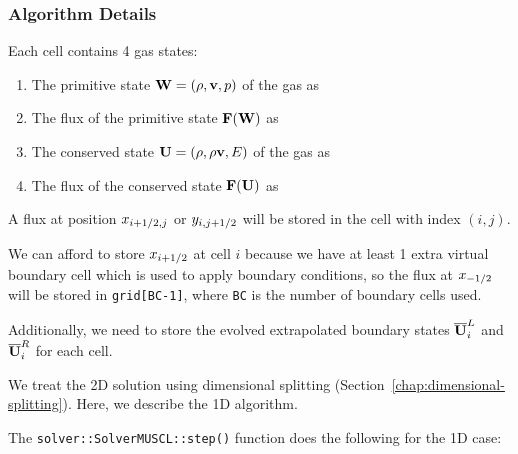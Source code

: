 \subsubsection{Algorithm Details}

Each cell contains 4 gas states:

\begin{enumerate}
\item The primitive state $\mathbf{W} = (\rho, \mathbf{v}, p)$ of the gas as 
\item The flux of the primitive state $\mathbf{F}(\mathbf{W})$ as 
\item The conserved state $\mathbf{U} = (\rho, \rho \mathbf{v}, E)$ of the gas as 
\item The flux of the conserved state $\mathbf{F}(\mathbf{U})$ as 
\end{enumerate}


A flux at position $x_{i+1/2, j}$ or $y_{i, j+1/2}$ will be stored in the
cell with index $(i, j)$.


We can afford to store $x_{i+1/2}$ at cell $i$ because we have at least 1
extra virtual boundary cell which is used to apply boundary conditions, so the
flux at $x_{-1/2}$ will be stored in \verb|grid[BC-1]|, where \texttt{BC} is
the number of boundary cells used.


Additionally, we need to store the evolved extrapolated boundary states
$\overline{\mathbf{U}}_i^L$ and $\overline{\mathbf{U}}_i^R$ for each cell.


We treat the 2D solution using dimensional splitting
(Section~\ref{chap:dimensional-splitting}). Here, we describe the 1D algorithm.

The \verb|solver::SolverMUSCL::step()| function does the following for the
1D case:

